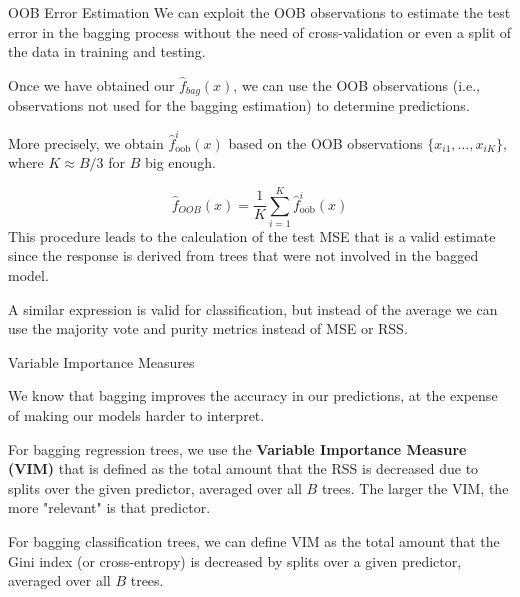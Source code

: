\documentclass{beamer}
\begin{document}
\begin{frame}{OOB Error Estimation}
	We can exploit the OOB observations to estimate the test error in the bagging process without the need of cross-validation or even a split of the data in training and testing.
	
	Once we have obtained our $\hat{f}_{bag}(x)$, we can use the OOB observations (i.e., observations not used for the bagging estimation) to determine predictions. 
	
	More precisely, we obtain $\hat{f}_{\textrm{oob}}^i (x)$ based on the OOB observations $\{x_{i1},\ldots, x_{iK}\}$, where $K \approx B/3$ for $B$ big enough. 
		
		
	
	
	\begin{equation*}
		\hat{f}_{OOB}(x)= \frac{1}{K}\sum_{i=1}^{K} \hat{f}^{i}_{\textrm{oob}}(x)
	\end{equation*}
This procedure leads to the calculation of the test MSE that is a valid estimate since the response is derived from trees that were not involved in the bagged model.

A similar expression is valid for classification, but instead of the average we can use the majority vote and purity metrics instead of MSE or RSS. 
\end{frame}


\begin{frame}{Variable Importance Measures}
	
	We know that bagging improves the accuracy in our predictions, at the expense of making our models harder to interpret. 
	
	For bagging regression trees, we use the {\bf Variable Importance Measure (VIM)} that is defined as the total amount that the RSS is decreased due to splits over the given predictor, averaged over all $B$ trees.  The larger the VIM, the more "relevant" is that predictor.
	
	For bagging classification trees, we can define VIM as the total amount that the Gini index (or cross-entropy) is decreased by splits over a given predictor, averaged over all $B$ trees. 
\end{frame}
\end{document}
